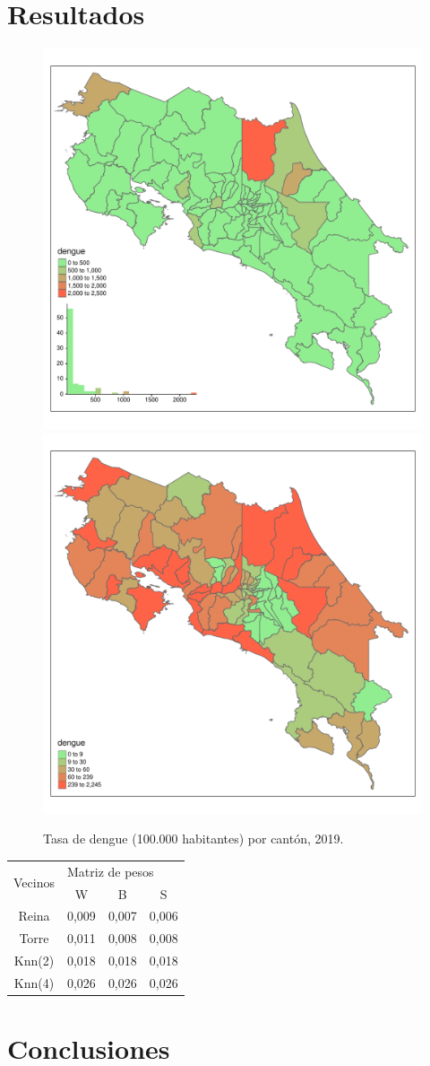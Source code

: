\documentclass[12pt,a4paper]{article}
\begin{document}
\section{Resultados}

\begin{figure}[hbtp]
\centering
\includegraphics[width=.48\textwidth]{F11.pdf}
\includegraphics[width=.48\textwidth]{F12.pdf}
\caption{Tasa de dengue (100.000 habitantes) por cantón, 2019.}
\end{figure}



\begin{table}[h]
\centering
\begin{tabular}{cccc}
\hline
\multirow{2}{*}{Vecinos} & \multicolumn{3}{l}{Matriz de pesos}\\ \cline{2-4} 
&W&B&S\\ \hline
Reina&0,009&0,007&0,006\\
Torre&0,011&0,008&0,008\\
Knn(2)&0,018&0,018&0,018\\
Knn(4)&0,026&0,026&0,026\\ \hline
\end{tabular}
\end{table}

\section{Conclusiones}
\end{document}

